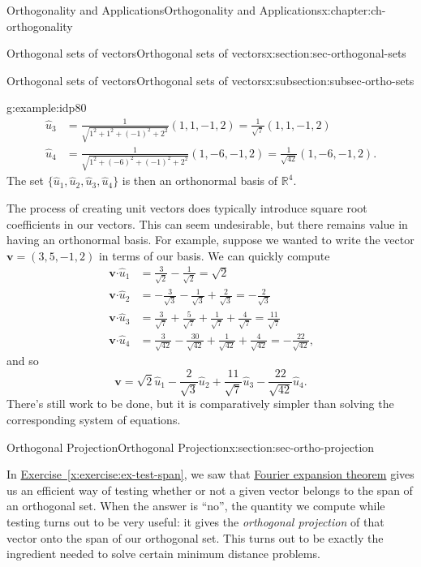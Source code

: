 \documentclass[oneside,10pt,]{book}
\newcommand{\xreffont}{\relax}
\numberwithin{equation}{section}
\newcommand{\R}{\mathbb{R}}
\newcommand{\dotp}{\!\boldsymbol{\cdot}\!}
\newcommand{\vv}{\mathbf{v}}
\newcommand{\amp}{&}
\begin{document}
\begin{chapterptx}{Orthogonality and Applications}{}{Orthogonality and Applications}{}{}{x:chapter:ch-orthogonality}
\begin{sectionptx}{Orthogonal sets of vectors}{}{Orthogonal sets of vectors}{}{}{x:section:sec-orthogonal-sets}
\begin{subsectionptx}{Orthogonal sets of vectors}{}{Orthogonal sets of vectors}{}{}{x:subsection:subsec-ortho-sets}
\begin{example}{}{g:example:idp80}
\begin{align*}
\hat{u}_3 \amp = \frac{1}{\sqrt{1^2+1^2+(-1)^2+2^2}}(1,1,-1,2) = \frac{1}{\sqrt{7}}(1,1,-1,2)\\
\hat{u}_4 \amp = \frac{1}{\sqrt{1^2+(-6)^2+(-1)^2+2^2}}(1,-6,-1,2) = \frac{1}{\sqrt{42}}(1,-6,-1,2)\text{.}
\end{align*}
The set \(\{\hat{u}_1,\hat{u}_2,\hat{u}_3,\hat{u}_4\}\) is then an orthonormal basis of \(\R^4\).%
\end{example}
The process of creating unit vectors does typically introduce square root coefficients in our vectors. This can seem undesirable, but there remains value in having an orthonormal basis. For example, suppose we wanted to write the vector \(\vv=(3,5,-1,2)\) in terms of our basis. We can quickly compute%
\begin{align*}
\vv\dotp\hat{u}_1 \amp = \frac{3}{\sqrt{2}}-\frac{1}{\sqrt{2}}=\sqrt{2}\\
\vv\dotp\hat{u}_2 \amp = -\frac{3}{\sqrt{3}}-\frac{1}{\sqrt{3}}+\frac{2}{\sqrt{3}}=-\frac{2}{\sqrt{3}}\\
\vv\dotp\hat{u}_3 \amp = \frac{3}{\sqrt{7}}+\frac{5}{\sqrt{7}}+\frac{1}{\sqrt{7}}+\frac{4}{\sqrt{7}} = \frac{11}{\sqrt{7}}\\
\vv\dotp\hat{u}_4 \amp = \frac{3}{\sqrt{42}}-\frac{30}{\sqrt{42}}+\frac{1}{\sqrt{42}}+\frac{4}{\sqrt{42}} = -\frac{22}{\sqrt{42}}\text{,}
\end{align*}
and so%
\begin{equation*}
\vv = \sqrt{2}\hat{u}_1-\frac{2}{\sqrt{3}}\hat{u}_2+\frac{11}{\sqrt{7}}\hat{u}_3-\frac{22}{\sqrt{42}}\hat{u}_4\text{.}
\end{equation*}
There's still work to be done, but it is comparatively simpler than solving the corresponding system of equations.%
\end{subsectionptx}
\end{sectionptx}
%
%
\typeout{************************************************}
\typeout{************************************************}
%
\begin{sectionptx}{Orthogonal Projection}{}{Orthogonal Projection}{}{}{x:section:sec-ortho-projection}
\begin{introduction}{}%
In \hyperref[x:exercise:ex-test-span]{Exercise~{\xreffont\ref{x:exercise:ex-test-span}}}, we saw that \hyperref[x:theorem:thm-fourier-expansion]{Fourier expansion theorem} gives us an efficient way of testing whether or not a given vector belongs to the span of an orthogonal set. When the answer is ``no'', the quantity we compute while testing turns out to be very useful: it gives the \emph{orthogonal projection} of that vector onto the span of our orthogonal set. This turns out to be exactly the ingredient needed to solve certain minimum distance problems.%

\end{introduction}
\end{sectionptx}
\end{chapterptx}
\end{document}
